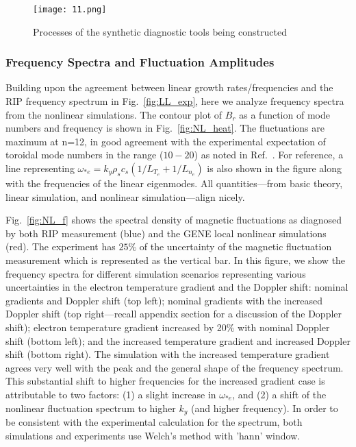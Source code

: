 \documentclass[
 aip,
 amsmath,amssymb,
 reprint
]{revtex4-1}
\begin{document}
\begin{figure}
        \texttt{[image: 11.png]}
        \centering
        \caption[font=5]{Processes of the synthetic diagnostic tools being constructed}
        \label{fig:syth}
\end{figure}


\subsubsection{Frequency Spectra and Fluctuation Amplitudes}\label{sec:NL_freq}

Building upon the agreement between linear growth rates/frequencies and the RIP frequency spectrum in Fig.~\ref{fig:LL_exp}, here we analyze frequency spectra from the nonlinear simulations.  The contour plot of $B_r$ as a function of mode numbers and frequency is shown in Fig.~\ref{fig:NL_heat}. The fluctuations are maximum at n=12, in good agreement with the experimental expectation of toroidal mode numbers in the range ($10-20$) as noted in Ref.~\cite{RIP_Chen_POP_2021}. For reference, a line representing $\omega_{*e} = k_y \rho_s c_s (1/L_{T_e} + 1/L_{n_e})$ is also shown in the figure along with the frequencies of the linear eigenmodes.  All quantities---from basic theory, linear simulation, and nonlinear simulation---align nicely.  



 Fig.~\ref{fig:NL_f} shows the spectral density of magnetic fluctuations as diagnosed by both RIP measurement (blue) and the GENE local nonlinear simulations (red).  The experiment has $25\%$ of the uncertainty of the magnetic fluctuation measurement which is represented as the vertical bar. 
In this figure, we show the frequency spectra for different simulation scenarios representing various uncertainties in the electron temperature gradient and the Doppler shift: nominal gradients and Doppler shift (top left); nominal gradients with the increased Doppler shift (top right---recall appendix section for a discussion of the Doppler shift);  electron temperature gradient increased by 20\% with nominal Doppler shift (bottom left); and the increased temperature gradient and increased Doppler shift (bottom right).  The simulation with the increased temperature gradient agrees very well with the peak and the general shape of the frequency spectrum.  This substantial shift to higher frequencies for the increased gradient case is attributable to two factors: (1) a slight increase in $\omega_{*e}$, and (2) a shift
of the nonlinear fluctuation spectrum to higher $k_y$ (and higher frequency). In order to be consistent with the experimental calculation for the spectrum, both simulations and experiments use Welch's method\cite{Welch} with 'hann' window. 
\end{document}
